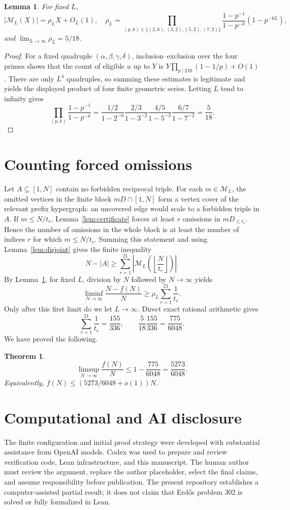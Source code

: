 \documentclass[11pt]{article}
\newtheorem{theorem}{Theorem}
\newtheorem{lemma}{Lemma}
\begin{document}
\begin{lemma}\label{lem:density}
For fixed $L$,
\[
 |\mathcal M_L(X)|=\rho_LX+O_L(1),
 \quad
 \rho_L=\prod_{(p,k)\in\{(2,6),(3,2),(5,2),(7,2)\}}
 \frac{1-p^{-1}}{1-p^{-k}}(1-p^{-kL}),
\]
and $\lim_{L\to\infty}\rho_L=5/18$.
\end{lemma}
\begin{proof}
For a fixed quadruple $(\alpha,\beta,\gamma,\delta)$, inclusion--exclusion
over the four primes shows that the count of eligible $u$ up to $Y$ is
$Y\prod_{p\mid210}(1-1/p)+O(1)$.  There are only $L^4$ quadruples, so summing
these estimates is legitimate and yields the displayed product of four
finite geometric series.  Letting $L$ tend to infinity gives
\[
 \prod_{(p,k)}\frac{1-p^{-1}}{1-p^{-k}}
 =\frac{1/2}{1-2^{-6}}\frac{2/3}{1-3^{-2}}
  \frac{4/5}{1-5^{-2}}\frac{6/7}{1-7^{-2}}=\frac5{18}.
\]
\end{proof}

\section{Counting forced omissions}
Let $A\subseteq[1,N]$ contain no forbidden reciprocal triple.  For each
$m\in\mathcal M_L$, the omitted vertices in the finite block
$mD\cap[1,N]$ form a vertex cover of the relevant prefix hypergraph: an
uncovered edge would scale to a forbidden triple in $A$.  If
$m\leq N/t_r$, Lemma~\ref{lem:certificate} forces at least $r$ omissions in
$mD_{\leq t_r}$.  Hence the number of omissions in the whole block is at
least the number of indices $r$ for which $m\leq N/t_r$.  Summing this
statement and using Lemma~\ref{lem:disjoint} gives the finite inequality
\[
 N-|A|\geq\sum_{r=1}^{21}
 \left|\mathcal M_L\!\left(\left\lfloor\frac N{t_r}\right\rfloor\right)\right|.
\]
By Lemma~\ref{lem:density}, for fixed $L$, division by $N$ followed by
$N\to\infty$ yields
\[
 \liminf_{N\to\infty}\frac{N-f(N)}N
 \geq \rho_L\sum_{r=1}^{21}\frac1{t_r}.
\]
Only after this first limit do we let $L\to\infty$.  Direct exact rational
arithmetic gives
\[
 \sum_{r=1}^{21}\frac1{t_r}=\frac{155}{336},\qquad
 \frac5{18}\frac{155}{336}=\frac{775}{6048}.
\]
We have proved the following.

\begin{theorem}
\[
 \limsup_{N\to\infty}\frac{f(N)}N
 \leq1-\frac{775}{6048}=\frac{5273}{6048}.
\]
Equivalently, $f(N)\leq(5273/6048+o(1))N$.
\end{theorem}

\section*{Computational and AI disclosure}
The finite configuration and initial proof strategy were developed with
substantial assistance from OpenAI models.  Codex was used to prepare and
review verification code, Lean infrastructure, and this manuscript.  The
human author must review the argument, replace the author placeholder, select
the final claims, and assume responsibility before publication.  The present
repository establishes a computer-assisted partial result; it does not claim
that Erd\H{o}s problem 302 is solved or fully formalized in Lean.
\end{document}
